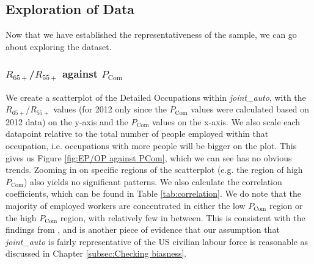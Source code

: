 \documentclass[11pt]{article}
\begin{document}
\subsection{Exploration of Data}
Now that we have established the representativeness of the sample, we can go about exploring the dataset. 

\subsubsection*{$R_{65+}$/$R_{55+}$ against $P_{\text{Com}}$}

We create a scatterplot of the Detailed Occupations within \emph{joint\_auto}, with the $R_{65+}$/$R_{55+}$ values (for 2012 only since the $P_{\text{Com}}$ values were calculated based on 2012 data) on the y-axis and the $P_{\text{Com}}$ values on the x-axis. We also scale each datapoint relative to the total number of people employed within that occupation, i.e. occupations with more people will be bigger on the plot. This gives us Figure \ref{fig:EP/OP against PCom}, which we can see has no obvious trends. Zooming in on specific regions of the scatterplot (e.g. the region of high $P_{\text{Com}}$) also yields no significant patterns. We also calculate the correlation coefficients, which can be found in Table \ref{tab:correlation}. We do note that the majority of employed workers are concentrated in either the low $P_{\text{Com}}$ region or the high $P_{\text{Com}}$ region, with relatively few in between. This is consistent with the findings from \cite{osborne2017future}, and is another piece of evidence that our assumption that \emph{joint\_auto} is fairly representative of the US civilian labour force is reasonable as discussed in Chapter \ref{subsec:Checking biasness}. 
\end{document}
